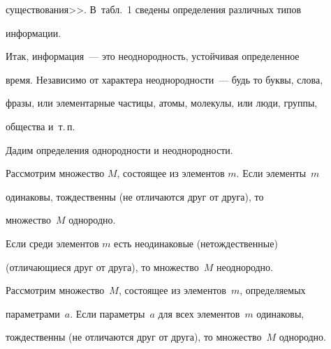 существования>>. В~табл.~1 сведены определения различных типов 


информации.











   Итак, информация~--- это неоднородность, устойчивая определенное 


время. Независимо от характера неоднородности~--- будь то буквы, слова, 


фразы, или элементарные частицы, атомы, молекулы, или люди, группы, 


общества и~т.\,п.


   


   Дадим определения однородности и неоднородности.


   


   Рассмотрим множество $M$, состоящее из элементов $m$. Если элементы~$m$ 


   одинаковы, тождественны (не отличаются друг от друга), то 


множество~$M$ однородно.


   


   Если среди элементов $m$ есть неодинаковые (нетождественные) 


(отличающиеся друг от друга), то множество~$M$ неоднородно.





Рассмотрим множество~$M$, состоящее из элементов~$m$, определяемых 


параметрами~$a$. Если параметры~$a$ для всех элементов~$m$ одинаковы, 


тождественны (не отличаются друг от друга), то множество~$M$ однородно.





